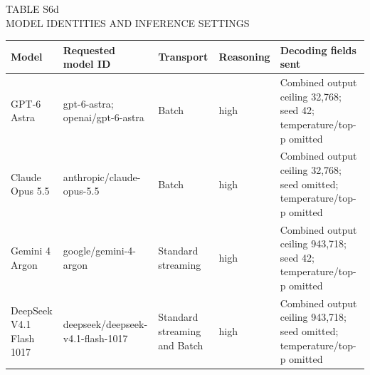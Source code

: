 \begin{table}[t]
\centering
\begingroup
\fontsize{10}{12}\selectfont
TABLE S6d\\
MODEL IDENTITIES AND INFERENCE SETTINGS\par\smallskip
\setlength{\tabcolsep}{4pt}
\renewcommand{\arraystretch}{1.15}
\begin{tabularx}{\linewidth}{@{}>{\hsize=0.85\hsize\raggedright\arraybackslash}X>{\hsize=1.2\hsize\raggedright\arraybackslash}X>{\hsize=0.9\hsize\raggedright\arraybackslash}X>{\hsize=0.6\hsize\raggedright\arraybackslash}X>{\hsize=1.45\hsize\raggedright\arraybackslash}X@{}}
\toprule
\textbf{Model} & \textbf{Requested model ID} & \textbf{Transport} & \textbf{Reasoning} & \textbf{Decoding fields sent} \\
\midrule
GPT-6 Astra & gpt-6-astra; openai/gpt-6-astra & Batch & high & Combined output ceiling 32,768; seed 42; temperature/top-p omitted \\
Claude Opus 5.5 & anthropic/claude-opus-5.5 & Batch & high & Combined output ceiling 32,768; seed omitted; temperature/top-p omitted \\
Gemini 4 Argon & google/gemini-4-argon & Standard streaming & high & Combined output ceiling 943,718; seed 42; temperature/top-p omitted \\
DeepSeek V4.1 Flash 1017 & deepseek/deepseek-v4.1-flash-1017 & Standard streaming and Batch & high & Combined output ceiling 943,718; seed omitted; temperature/top-p omitted \\
\bottomrule
\end{tabularx}
\endgroup
\end{table}
